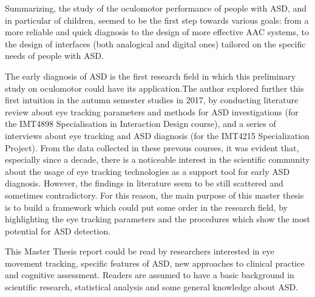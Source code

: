 Summarizing, the study of the oculomotor performance of people with ASD, and in particular of children, seemed to be the first step towards various goals: from a more reliable and quick diagnosis to the design of more effective AAC systems, to the design of interfaces (both analogical and digital ones) tailored on the specific needs of people with ASD.

The early diagnosis of ASD is the first research field in which this preliminary study on oculomotor could have its application.The author explored further this first intuition in the autumn semester studies in 2017, by conducting literature review about eye tracking parameters and methods for ASD investigations (for the IMT4898 Specialisation in Interaction Design course), and a series of interviews 
about eye tracking and ASD diagnosis (for the IMT4215 Specialization Project). From the data collected in these prevous courses, it was evident that, especially since a decade, there is a noticeable interest in the scientific community about the usage of eye tracking technologies as a support tool for early ASD diagnosis. However, the findings in literature seem to be still scattered and sometimes contradictory. For this reason, the main purpose of this master thesis is to build a framework which could put some order in the research field, by highlighting the eye tracking parameters and the procedures which show the most potential for ASD detection.

This Master Thesis report could be read by researchers interested in eye movement tracking, specific features of ASD, new approaches to clinical practice and cognitive assessment.
Readers are assumed to have a basic background in scientific research, statistical analysis and some general knowledge about ASD.\\[2cm]

\thesisdate \\[1pc]
\\[1pc]
